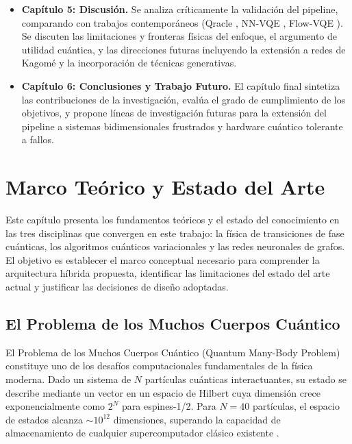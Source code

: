 \documentclass[11pt,a4paper,spanish]{book}
\begin{document}
\begin{itemize}
    \item \textbf{Capítulo 5: Discusión.} Se analiza críticamente la validación del pipeline, comparando con trabajos contemporáneos (Qracle \citep{zhang2025}, NN-VQE \citep{miao2024}, Flow-VQE \citep{zou2026}). Se discuten las limitaciones y fronteras físicas del enfoque, el argumento de utilidad cuántica, y las direcciones futuras incluyendo la extensión a redes de Kagomé y la incorporación de técnicas generativas.

    \item \textbf{Capítulo 6: Conclusiones y Trabajo Futuro.} El capítulo final sintetiza las contribuciones de la investigación, evalúa el grado de cumplimiento de los objetivos, y propone líneas de investigación futuras para la extensión del pipeline a sistemas bidimensionales frustrados y hardware cuántico tolerante a fallos.
\end{itemize}



\chapter{Marco Teórico y Estado del Arte}

Este capítulo presenta los fundamentos teóricos y el estado del conocimiento en las tres disciplinas que convergen en este trabajo: la física de transiciones de fase cuánticas, los algoritmos cuánticos variacionales y las redes neuronales de grafos. El objetivo es establecer el marco conceptual necesario para comprender la arquitectura híbrida propuesta, identificar las limitaciones del estado del arte actual y justificar las decisiones de diseño adoptadas.

\section{El Problema de los Muchos Cuerpos Cuántico}

El Problema de los Muchos Cuerpos Cuántico (Quantum Many-Body Problem) constituye uno de los desafíos computacionales fundamentales de la física moderna. Dado un sistema de $N$ partículas cuánticas interactuantes, su estado se describe mediante un vector en un espacio de Hilbert cuya dimensión crece exponencialmente como $2^N$ para espines-1/2. Para $N = 40$ partículas, el espacio de estados alcanza $\sim 10^{12}$ dimensiones, superando la capacidad de almacenamiento de cualquier supercomputador clásico existente \citep{feynman1982}.
\end{document}
